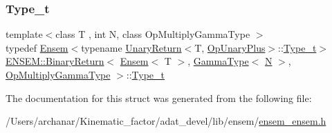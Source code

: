 \subsubsection{\texorpdfstring{Type\_t}{Type\_t}\hspace{0.1cm}{\footnotesize\ttfamily [2/2]}}
{\footnotesize\ttfamily template$<$class T , int N, class Op\+Multiply\+Gamma\+Type $>$ \\
typedef \mbox{\hyperlink{classENSEM_1_1Ensem}{Ensem}}$<$typename \mbox{\hyperlink{structENSEM_1_1UnaryReturn}{Unary\+Return}}$<$T, \mbox{\hyperlink{structENSEM_1_1OpUnaryPlus}{Op\+Unary\+Plus}}$>$\+::\mbox{\hyperlink{structENSEM_1_1BinaryReturn_3_01Ensem_3_01T_01_4_00_01GammaType_3_01N_01_4_00_01OpMultiplyGammaType_01_4_ab57ac60220530b540f3dfbb2cd5279df}{Type\+\_\+t}}$>$ \mbox{\hyperlink{structENSEM_1_1BinaryReturn}{E\+N\+S\+E\+M\+::\+Binary\+Return}}$<$ \mbox{\hyperlink{classENSEM_1_1Ensem}{Ensem}}$<$ T $>$, \mbox{\hyperlink{classENSEM_1_1GammaType}{Gamma\+Type}}$<$ \mbox{\hyperlink{operator__name__util_8cc_a7722c8ecbb62d99aee7ce68b1752f337}{N}} $>$, \mbox{\hyperlink{structENSEM_1_1OpMultiplyGammaType}{Op\+Multiply\+Gamma\+Type}} $>$\+::\mbox{\hyperlink{structENSEM_1_1BinaryReturn_3_01Ensem_3_01T_01_4_00_01GammaType_3_01N_01_4_00_01OpMultiplyGammaType_01_4_ab57ac60220530b540f3dfbb2cd5279df}{Type\+\_\+t}}}



The documentation for this struct was generated from the following file\+:\begin{DoxyCompactItemize}
\item 
/\+Users/archanar/\+Kinematic\+\_\+factor/adat\+\_\+devel/lib/ensem/\mbox{\hyperlink{lib_2ensem_2ensem__ensem_8h}{ensem\+\_\+ensem.\+h}}\end{DoxyCompactItemize}
